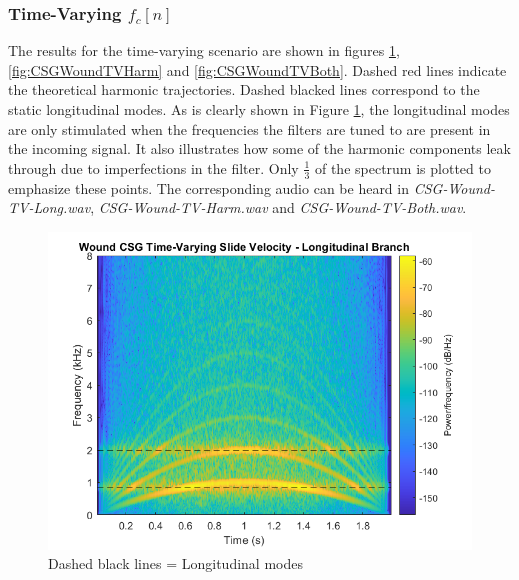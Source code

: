\documentclass[../main.tex]{subfiles}
\begin{document}
\subsubsection{Time-Varying $f_c[n]$}
The results for the time-varying scenario are shown in figures \ref{fig:CSGWoundTVLong}, \ref{fig:CSGWoundTVHarm} and \ref{fig:CSGWoundTVBoth}. Dashed red lines indicate the theoretical harmonic trajectories. Dashed blacked lines correspond to the static longitudinal modes. As is clearly shown in Figure \ref{fig:CSGWoundTVLong}, the longitudinal modes are only stimulated when the frequencies the filters are tuned to are present in the incoming signal. It also illustrates how some of the harmonic components leak through due to imperfections in the filter. Only $\frac{1}{3}$ of the spectrum is plotted to emphasize these points. The corresponding audio can be heard in \emph{CSG-Wound-TV-Long.wav}, \emph{CSG-Wound-TV-Harm.wav} and \emph{CSG-Wound-TV-Both.wav}.

\begin{figure}[h]
    \centering
    \includegraphics[scale=.65]{./images/plots/CSG_Wound_TV_Long.png}
    \caption{Dashed black lines = Longitudinal modes}
    \label{fig:CSGWoundTVLong}
\end{figure}
\end{document}
